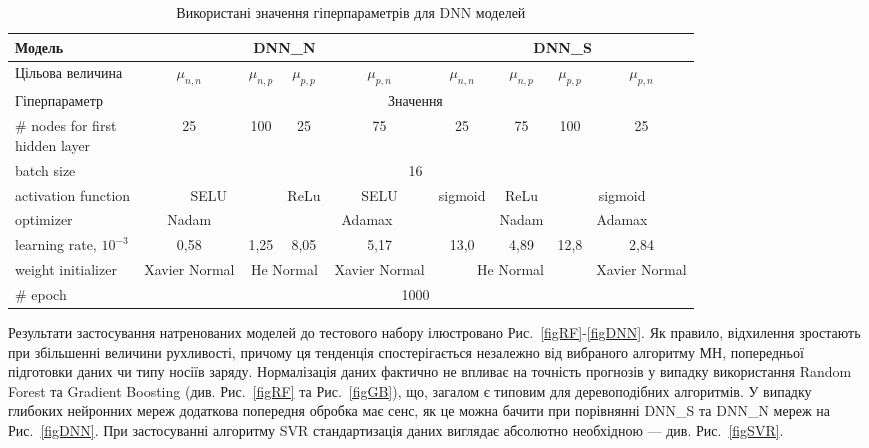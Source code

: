 \documentclass[14pt,a4paper,titlepage,oneside]{book}
\numberwithin{equation}{part}
\begin{document}
\begin{table}[!ht]
\setlength{\tabcolsep}{1pt}
\caption{Використані значення гіперпараметрів для DNN моделей}
\label{tblDNNrez}
\centering
\begin{tabular}{|l|c|c|c|c|c|c|c|c|}
\hline
Модель& \multicolumn{4}{c|}{DNN\_N}& \multicolumn{4}{c|}{DNN\_S} \rule{0pt}{11pt}\\
\hline
Цільова величина&$\mu_{n,n}$&$\mu_{n,p}$&$\mu_{p,p}$&$\mu_{p,n}$&$\mu_{n,n}$&$\mu_{n,p}$&$\mu_{p,p}$&$\mu_{p,n}$\\
\hline
Гіперпараметр&\multicolumn{8}{c|}{Значення}\\
\hline
\makecell{\# nodes for first \\hidden layer} &25&100&25&75&25&75&100&25\\
\hline
batch size&\multicolumn{8}{c|}{16}\\
\hline
activation function &\multicolumn{2}{c|}{SELU}&ReLu&SELU&sigmoid&ReLu&\multicolumn{2}{c|}{sigmoid}\\
\hline
optimizer	&Nadam&\multicolumn{4}{c|}{Adamax}&Nadam&\multicolumn{2}{c|}{Adamax}\\
\hline
learning rate, $10^{-3}$	&0,58&1,25&8,05&5,17&13,0&4,89&12,8&2,84\\
\hline
weight initializer &Xavier Normal&\multicolumn{2}{c|}{He Normal}&Xavier Normal&\multicolumn{3}{c|}{He Normal}&Xavier Normal\\
\hline
\# epoch &\multicolumn{8}{c|}{1000}\\
\hline
\end{tabular}
\end{table}

Результати застосування натренованих моделей до тестового набору ілюстровано Рис.~\ref{figRF}-\ref{figDNN}.
Як правило, відхилення зростають при збільшенні величини рухливості, причому ця тенденція спостерігається
незалежно від вибраного алгоритму МН, попередньої підготовки даних чи типу носіїв заряду.
Нормалізація даних фактично не впливає на точність прогнозів у випадку використання Random Forest та Gradient Boosting
(див. Рис.~\ref{figRF} та Рис.~\ref{figGB}), що, загалом є типовим для деревоподібних алгоритмів.
У випадку глибоких нейронних мереж додаткова попередня обробка має сенс, як це можна бачити при порівнянні DNN\_S та DNN\_N мереж
на Рис.~\ref{figDNN}.
При застосуванні алгоритму SVR стандартизація даних виглядає абсолютно необхідною --- див. Рис.~\ref{figSVR}.
\end{document}
